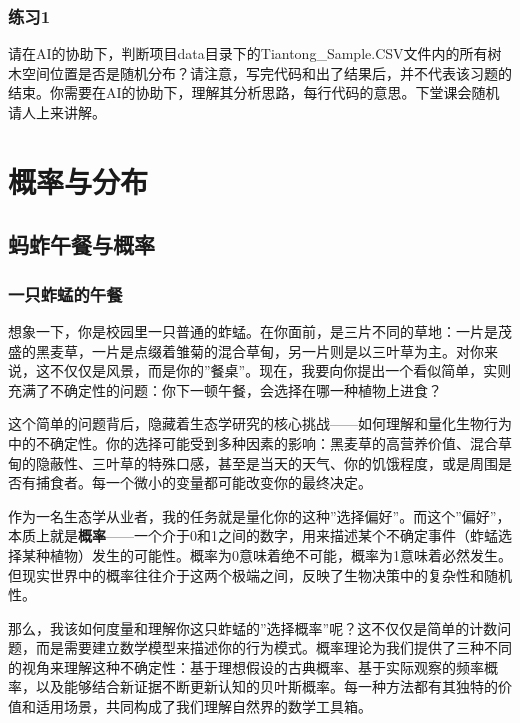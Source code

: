 \documentclass[
  twoside]{book}
\begin{document}
\hypertarget{ux7ec3ux4e601}{%
\subsection{练习1}\label{ux7ec3ux4e601}}

请在AI的协助下，判断项目data目录下的Tiantong\_Sample.CSV文件内的所有树木空间位置是否是随机分布？请注意，写完代码和出了结果后，并不代表该习题的结束。你需要在AI的协助下，理解其分析思路，每行代码的意思。下堂课会随机请人上来讲解。

\hypertarget{ux6982ux7387ux4e0eux5206ux5e03}{%
\chapter{概率与分布}\label{ux6982ux7387ux4e0eux5206ux5e03}}

\hypertarget{ux8682ux86b1ux5348ux9910ux4e0eux6982ux7387}{%
\section{蚂蚱午餐与概率}\label{ux8682ux86b1ux5348ux9910ux4e0eux6982ux7387}}

\hypertarget{ux4e00ux53eaux86b1ux8722ux7684ux5348ux9910}{%
\subsection{一只蚱蜢的午餐}\label{ux4e00ux53eaux86b1ux8722ux7684ux5348ux9910}}

想象一下，你是校园里一只普通的蚱蜢。在你面前，是三片不同的草地：一片是茂盛的黑麦草，一片是点缀着雏菊的混合草甸，另一片则是以三叶草为主。对你来说，这不仅仅是风景，而是你的''餐桌''。现在，我要向你提出一个看似简单，实则充满了不确定性的问题：你下一顿午餐，会选择在哪一种植物上进食？

这个简单的问题背后，隐藏着生态学研究的核心挑战------如何理解和量化生物行为中的不确定性。你的选择可能受到多种因素的影响：黑麦草的高营养价值、混合草甸的隐蔽性、三叶草的特殊口感，甚至是当天的天气、你的饥饿程度，或是周围是否有捕食者。每一个微小的变量都可能改变你的最终决定。

作为一名生态学从业者，我的任务就是量化你的这种''选择偏好''。而这个''偏好''，本质上就是\textbf{概率}------一个介于0和1之间的数字，用来描述某个不确定事件（蚱蜢选择某种植物）发生的可能性。概率为0意味着绝不可能，概率为1意味着必然发生。但现实世界中的概率往往介于这两个极端之间，反映了生物决策中的复杂性和随机性。

那么，我该如何度量和理解你这只蚱蜢的''选择概率''呢？这不仅仅是简单的计数问题，而是需要建立数学模型来描述你的行为模式。概率理论为我们提供了三种不同的视角来理解这种不确定性：基于理想假设的古典概率、基于实际观察的频率概率，以及能够结合新证据不断更新认知的贝叶斯概率。每一种方法都有其独特的价值和适用场景，共同构成了我们理解自然界的数学工具箱。
\end{document}
